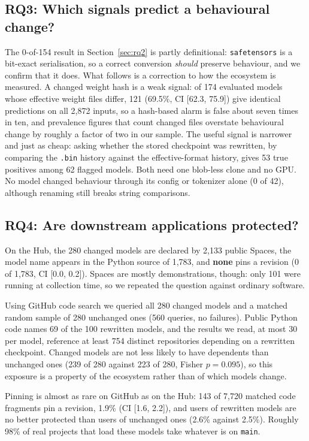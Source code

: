 \documentclass[conference]{IEEEtran}
\newcommand{\code}[1]{\texttt{#1}}
\begin{document}
\subsection{RQ3: Which signals predict a behavioural change?}
The 0-of-154 result in Section~\ref{sec:rq2} is partly definitional: \code{safetensors} is a bit-exact serialisation, so a correct conversion \emph{should} preserve behaviour, and we confirm that it does. What follows is a correction to how the ecosystem is measured. A changed weight hash is a weak signal: of 174 evaluated models whose effective weight files differ, 121 (69.5\%, CI [62.3, 75.9]) give identical predictions on all 2,872 inputs, so a hash-based alarm is false about seven times in ten, and prevalence figures that count changed files overstate behavioural change by roughly a factor of two in our sample. The useful signal is narrower and just as cheap: asking whether the stored checkpoint was rewritten, by comparing the \code{.bin} history against the effective-format history, gives 53 true positives among 62 flagged models. Both need one blob-less clone and no GPU. No model changed behaviour through its config or tokenizer alone (0 of 42), although renaming still breaks string comparisons.

\subsection{RQ4: Are downstream applications protected?}
On the Hub, the 280 changed models are declared by 2,133 public Spaces, the model name appears in the Python source of 1,783, and \textbf{none} pins a revision (0 of 1,783, CI [0.0, 0.2]). Spaces are mostly demonstrations, though: only 101 were running at collection time, so we repeated the question against ordinary software.

Using GitHub code search we queried all 280 changed models and a matched random sample of 280 unchanged ones (560 queries, no failures). Public Python code names 69 of the 100 rewritten models, and the results we read, at most 30 per model, reference at least 754 distinct repositories depending on a rewritten checkpoint. Changed models are not less likely to have dependents than unchanged ones (239 of 280 against 223 of 280, Fisher $p = 0.095$), so this exposure is a property of the ecosystem rather than of which models change.

Pinning is almost as rare on GitHub as on the Hub: 143 of 7,720 matched code fragments pin a revision, 1.9\% (CI [1.6, 2.2]), and users of rewritten models are no better protected than users of unchanged ones (2.6\% against 2.5\%). Roughly 98\% of real projects that load these models take whatever is on \code{main}.
\end{document}

